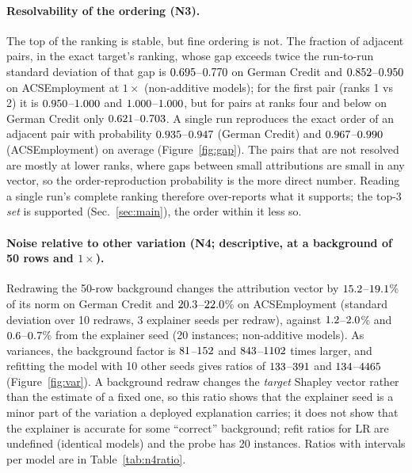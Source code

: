 \paragraph{Resolvability of the ordering (N3).} The top of the ranking is stable, but fine ordering is not. The fraction of adjacent pairs, in the exact target's ranking, whose gap exceeds twice the run-to-run standard deviation of that gap is $0.695$--$0.770$ on German Credit and $0.852$--$0.950$ on ACSEmployment at $1\times$ (non-additive models); for the first pair (ranks 1 vs 2) it is $0.950$--$1.000$ and $1.000$--$1.000$, but for pairs at ranks four and below on German Credit only $0.621$--$0.703$. A single run reproduces the exact order of an adjacent pair with probability $0.935$--$0.947$ (German Credit) and $0.967$--$0.990$ (ACSEmployment) on average (Figure~\ref{fig:gap}). The pairs that are not resolved are mostly at lower ranks, where gaps between small attributions are small in any vector, so the order-reproduction probability is the more direct number. Reading a single run's complete ranking therefore over-reports what it supports; the top-3 \emph{set} is supported (Sec.~\ref{sec:main}), the order within it less so.

\paragraph{Noise relative to other variation (N4; descriptive, at a background of 50 rows and $1\times$).} Redrawing the 50-row background changes the attribution vector by $15.2$--$19.1$\% of its norm on German Credit and $20.3$--$22.0$\% on ACSEmployment (standard deviation over 10 redraws, 3 explainer seeds per redraw), against $1.2$--$2.0$\% and $0.6$--$0.7$\% from the explainer seed (20 instances; non-additive models). As variances, the background factor is $81$--$152$ and $843$--$1102$ times larger, and refitting the model with 10 other seeds gives ratios of $133$--$391$ and $134$--$4465$ (Figure~\ref{fig:var}). A background redraw changes the \emph{target} Shapley vector rather than the estimate of a fixed one, so this ratio shows that the explainer seed is a minor part of the variation a deployed explanation carries; it does not show that the explainer is accurate for some ``correct'' background; refit ratios for LR are undefined (identical models) and the probe has 20 instances. Ratios with intervals per model are in Table~\ref{tab:n4ratio}.

